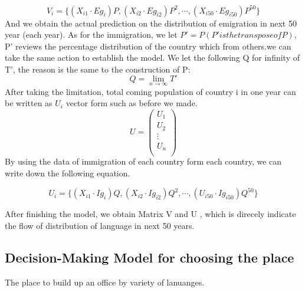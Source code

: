 \documentclass{mcmthesis}
\begin{document}
\begin{equation}
V_i = \{(X_{i1} \cdot Eg_{i})P, (X_{i2} \cdot Eg_{i2})P^2, \cdots, (X_{i 50} \cdot Eg_{i 50})P^{50}\}
\end{equation}
And we obtain the actual prediction on the distribution of emigration in next 50 year (each year).
As for the immigration, 
we let $P'=P (P'is the transpose of P)$, P’ reviews the percentage distribution of the country which from others.we can take the same action to establish the model.
We let the following Q for infinity of T', the reason is the same to the construction of P:
\begin{displaymath}
Q=\lim_{n \to \infty} T'
\end{displaymath}
After taking the limitation, total coming population of country i in one year can be written as $U_i$ vector form such as before we made.
\begin{displaymath}
U=\begin{pmatrix}
  {U_{1} }  \\
  {U_{2} }  \\
  {\vdots } \\
  {U_{n} }  \\
  \end{pmatrix}
\end{displaymath}
By using the data of immigration of each country form each country, we can write down the following equation.

\begin{equation}
U_i = \{(X_{i1} \cdot Ig_{i})Q, (X_{i2} \cdot Ig_{i2})Q^2, \cdots, (U_{i 50} \cdot Ig_{i 50})Q^{50}\}
\end{equation}

After finishing the model, we obtain Matrix V and U , which is direcely indicate the flow of distribution of language in next 50 years.

\subsection{Decision-Making Model for choosing the place }
The place to build up an office by variety of lanuanges. 
\end{document}
